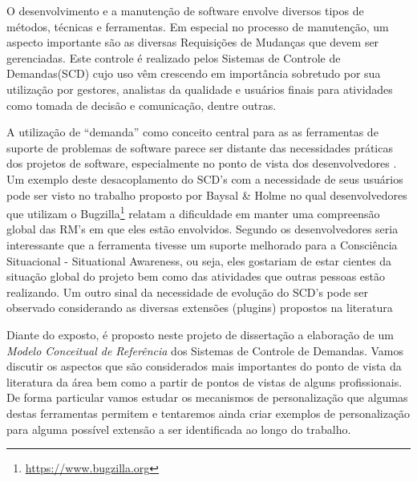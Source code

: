 \documentclass[msc,proposal,hidelot,hideabstract]{ppgccufmg} %
\begin{document}
O desenvolvimento e a manutenção de software envolve diversos tipos de métodos,
técnicas e ferramentas. Em especial no processo de manutenção, um aspecto
importante são as diversas Requisições de Mudanças que devem ser
gerenciadas. Este controle é realizado pelos Sistemas de Controle de Demandas(SCD) cujo uso vêm crescendo em importância sobretudo
por sua utilização por gestores, analistas da qualidade e usuários finais para
atividades como tomada de decisão e comunicação, dentre outras.

A utilização de  ``demanda'' como conceito central para as as ferramentas de
suporte de problemas de software parece ser distante das necessidades práticas dos projetos de software, especialmente
no ponto de vista dos desenvolvedores \cite{Baysal:2013:SAP:2486788.2486957}. Um exemplo deste desacoplamento do
SCD's com a necessidade de seus usuários pode ser visto no trabalho proposto por Baysal \& Holme \cite{baysal2012qualitative} no qual desenvolvedores que utilizam o Bugzilla\footnote{\url{https://www.bugzilla.org}} relatam a
dificuldade em manter uma compreensão global das RM's em que eles estão
envolvidos. Segundo os desenvolvedores seria interessante que a ferramenta
tivesse um suporte melhorado para a Consciência Situacional - Situational
Awareness, ou seja, eles gostariam de estar cientes da situação global do
projeto bem como das atividades que outras pessoas estão realizando. Um outro
sinal da necessidade de evolução do SCD's pode ser observado considerando as diversas extensões (plugins) propostos na literatura \cite{101186,Thung:2014:BIT:2635868.2661678,Kononenko:2014:DED:2591062.2591075}

Diante do exposto, é proposto neste projeto de dissertação a elaboração de um
\textit{Modelo Conceitual de Referência} dos Sistemas de Controle de Demandas. Vamos discutir os aspectos que são
considerados mais importantes do ponto de vista da literatura da área bem como
a partir de pontos de vistas de alguns profissionais. De forma particular vamos
estudar os mecanismos de personalização que algumas destas ferramentas permitem
e tentaremos ainda criar exemplos de personalização para alguma possível
extensão a ser identificada ao longo do trabalho.
\end{document}
